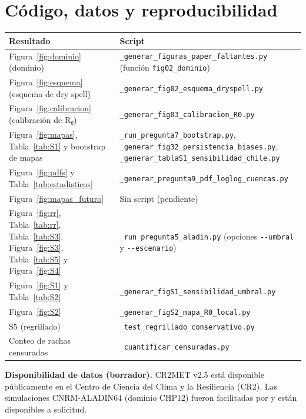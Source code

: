 \chapter{Código, datos y reproducibilidad}\label{anx:B}


{\def\LTcaptype{none} %
\begin{longtable}[]{@{}
  >{\raggedright\arraybackslash}p{}
  >{\raggedright\arraybackslash}p{}@{}}
\toprule\noalign{}
\begin{minipage}[b]{\linewidth}\raggedright
Resultado
\end{minipage} & \begin{minipage}[b]{\linewidth}\raggedright
Script
\end{minipage} \\
\midrule\noalign{}
\endhead
\bottomrule\noalign{}
\endlastfoot
Figura~\ref{fig:dominio} (dominio) & \texttt{\_generar\_figuras\_paper\_faltantes.py} (función \texttt{fig02\_dominio}) \\
Figura~\ref{fig:esquema} (esquema de dry spell) & \texttt{\_generar\_fig02\_esquema\_dryspell.py} \\
Figura~\ref{fig:calibracion} (calibración de R₀) & \texttt{\_generar\_fig03\_calibracion\_R0.py} \\
Figura~\ref{fig:mapas}, Tabla~\ref{tab:S1} y bootstrap de mapas & \texttt{\_run\_pregunta7\_bootstrap.py}, \texttt{\_generar\_fig32\_persistencia\_biases.py}, \texttt{\_generar\_tablaS1\_sensibilidad\_chile.py} \\
Figura~\ref{fig:pdfs} y Tabla~\ref{tab:estadisticos} & \texttt{\_generar\_pregunta9\_pdf\_loglog\_cuencas.py} \\
Figura~\ref{fig:mapas_futuro} & Sin script (pendiente) \\
Figura~\ref{fig:rr}, Tabla~\ref{tab:rr}, Tabla~\ref{tab:S3}, Figura~\ref{fig:S3}, Tabla~\ref{tab:S5} y Figura~\ref{fig:S4} & \texttt{\_run\_pregunta5\_aladin.py} (opciones \texttt{-\/-umbral} y \texttt{-\/-escenario}) \\
Figura~\ref{fig:S1} y Tabla~\ref{tab:S2} & \texttt{\_generar\_figS1\_sensibilidad\_umbral.py} \\
Figura~\ref{fig:S2} & \texttt{\_generar\_figS2\_mapa\_R0\_local.py} \\
S5 (regrillado) & \texttt{\_test\_regrillado\_conservativo.py} \\
Conteo de rachas censuradas & \texttt{\_cuantificar\_censuradas.py} \\
\end{longtable}
}

\textbf{Disponibilidad de datos (borrador).} CR2MET v2.5 está disponible públicamente en el Centro de Ciencia del Clima y la Resiliencia (CR2). Las simulaciones CNRM-ALADIN64 (dominio CHP12) fueron facilitadas por  y están disponibles a solicitud.
